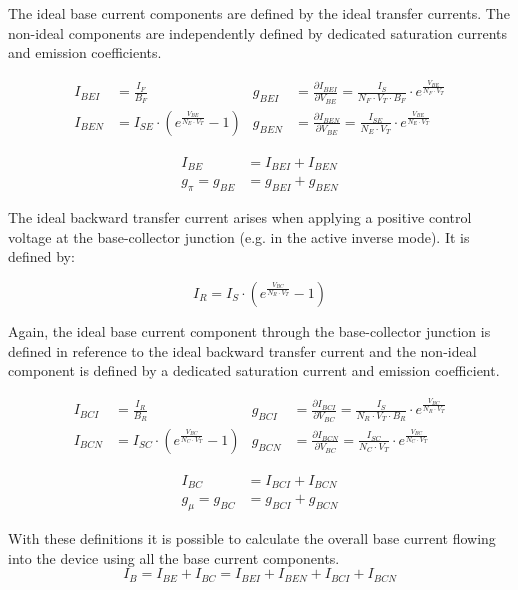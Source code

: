 \documentclass[10pt]{report}
\begin{document}
The ideal base current components are defined by the ideal transfer
currents.  The non-ideal components are independently defined by
dedicated saturation currents and emission coefficients.

\begin{align}
I_{BEI} &= \frac{I_F}{B_F} &
g_{BEI} &= \frac{\partial I_{BEI}}{\partial V_{BE}} = \frac{I_S}{N_F\cdot V_T \cdot B_F}\cdot e^{\frac{V_{BE}}{N_F\cdot V_T}}\\
I_{BEN} &= I_{SE}\cdot \left(e^{\frac{V_{BE}}{N_E\cdot V_T}} -1\right) &
g_{BEN} &= \frac{\partial I_{BEN}}{\partial V_{BE}} = \frac{I_{SE}}{N_E\cdot V_T}\cdot e^{\frac{V_{BE}}{N_E\cdot V_T}}
\end{align}

\begin{align}
I_{BE} &= I_{BEI} + I_{BEN}\\
g_{\pi} = g_{BE} &= g_{BEI} + g_{BEN}
\end{align}

The ideal backward transfer current arises when applying a positive
control voltage at the base-collector junction (e.g. in the active
inverse mode).  It is defined by:

\begin{equation}
I_R = I_S\cdot \left(e^{\frac{V_{BC}}{N_R\cdot V_T}} -1\right)
\end{equation}

Again, the ideal base current component through the base-collector
junction is defined in reference to the ideal backward transfer
current and the non-ideal component is defined by a dedicated
saturation current and emission coefficient.

\begin{align}
I_{BCI} &= \frac{I_R}{B_R} &
g_{BCI} &= \frac{\partial I_{BCI}}{\partial V_{BC}} = \frac{I_S}{N_R\cdot V_T \cdot B_R}\cdot e^{\frac{V_{BC}}{N_R\cdot V_T}}\\
I_{BCN} &= I_{SC}\cdot \left(e^{\frac{V_{BC}}{N_C\cdot V_T}} -1\right) &
g_{BCN} &= \frac{\partial I_{BCN}}{\partial V_{BC}} = \frac{I_{SC}}{N_C\cdot V_T}\cdot e^{\frac{V_{BC}}{N_C\cdot V_T}}
\end{align}

\begin{align}
I_{BC} &= I_{BCI} + I_{BCN}\\
g_{\mu} = g_{BC} &= g_{BCI} + g_{BCN}
\end{align}

With these definitions it is possible to calculate the overall base
current flowing into the device using all the base current components.
\begin{equation}
I_B = I_{BE} + I_{BC} = I_{BEI} + I_{BEN} + I_{BCI} + I_{BCN}
\end{equation}
\end{document}
